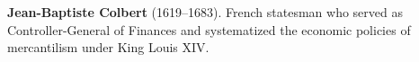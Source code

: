 \textbf{Jean-Baptiste Colbert} (1619–1683). French statesman who served as Controller-General of Finances and systematized the economic policies of mercantilism under King Louis XIV.

